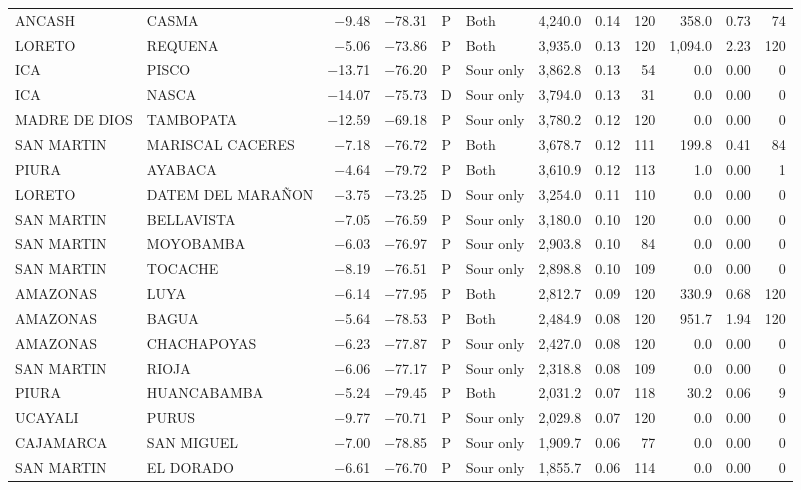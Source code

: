 \begin{landscape}
\begin{longtable}{llrrclrrrrrr}
ANCASH & CASMA & $-$9.48 & $-$78.31 & P & Both & 4,240.0 & 0.14 & 120 & 358.0 & 0.73 & 74 \\
LORETO & REQUENA & $-$5.06 & $-$73.86 & P & Both & 3,935.0 & 0.13 & 120 & 1,094.0 & 2.23 & 120 \\
ICA & PISCO & $-$13.71 & $-$76.20 & P & Sour only & 3,862.8 & 0.13 & 54 & 0.0 & 0.00 & 0 \\
ICA & NASCA & $-$14.07 & $-$75.73 & D & Sour only & 3,794.0 & 0.13 & 31 & 0.0 & 0.00 & 0 \\
MADRE DE DIOS & TAMBOPATA & $-$12.59 & $-$69.18 & P & Sour only & 3,780.2 & 0.12 & 120 & 0.0 & 0.00 & 0 \\
SAN MARTIN & MARISCAL CACERES & $-$7.18 & $-$76.72 & P & Both & 3,678.7 & 0.12 & 111 & 199.8 & 0.41 & 84 \\
PIURA & AYABACA & $-$4.64 & $-$79.72 & P & Both & 3,610.9 & 0.12 & 113 & 1.0 & 0.00 & 1 \\
LORETO & DATEM DEL MARAÑON & $-$3.75 & $-$73.25 & D & Sour only & 3,254.0 & 0.11 & 110 & 0.0 & 0.00 & 0 \\
SAN MARTIN & BELLAVISTA & $-$7.05 & $-$76.59 & P & Sour only & 3,180.0 & 0.10 & 120 & 0.0 & 0.00 & 0 \\
SAN MARTIN & MOYOBAMBA & $-$6.03 & $-$76.97 & P & Sour only & 2,903.8 & 0.10 & 84 & 0.0 & 0.00 & 0 \\
SAN MARTIN & TOCACHE & $-$8.19 & $-$76.51 & P & Sour only & 2,898.8 & 0.10 & 109 & 0.0 & 0.00 & 0 \\
AMAZONAS & LUYA & $-$6.14 & $-$77.95 & P & Both & 2,812.7 & 0.09 & 120 & 330.9 & 0.68 & 120 \\
AMAZONAS & BAGUA & $-$5.64 & $-$78.53 & P & Both & 2,484.9 & 0.08 & 120 & 951.7 & 1.94 & 120 \\
AMAZONAS & CHACHAPOYAS & $-$6.23 & $-$77.87 & P & Sour only & 2,427.0 & 0.08 & 120 & 0.0 & 0.00 & 0 \\
SAN MARTIN & RIOJA & $-$6.06 & $-$77.17 & P & Sour only & 2,318.8 & 0.08 & 109 & 0.0 & 0.00 & 0 \\
PIURA & HUANCABAMBA & $-$5.24 & $-$79.45 & P & Both & 2,031.2 & 0.07 & 118 & 30.2 & 0.06 & 9 \\
UCAYALI & PURUS & $-$9.77 & $-$70.71 & P & Sour only & 2,029.8 & 0.07 & 120 & 0.0 & 0.00 & 0 \\
CAJAMARCA & SAN MIGUEL & $-$7.00 & $-$78.85 & P & Sour only & 1,909.7 & 0.06 & 77 & 0.0 & 0.00 & 0 \\
SAN MARTIN & EL DORADO & $-$6.61 & $-$76.70 & P & Sour only & 1,855.7 & 0.06 & 114 & 0.0 & 0.00 & 0 \\

\end{longtable}
\end{landscape}
